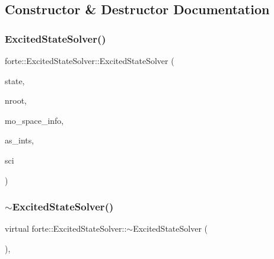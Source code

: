 \subsection{Constructor \& Destructor Documentation}
\mbox{\label{classforte_1_1_excited_state_solver_ad0bd62104f32a74a473498b86f351217}} 
\subsubsection{\texorpdfstring{Excited\+State\+Solver()}{ExcitedStateSolver()}}
{\footnotesize\ttfamily forte\+::\+Excited\+State\+Solver\+::\+Excited\+State\+Solver (\begin{DoxyParamCaption}\item[{\mbox{\hyperlink{classforte_1_1_state_info}{State\+Info}}}]{state,  }\item[{size\+\_\+t}]{nroot,  }\item[{std\+::shared\+\_\+ptr$<$ \mbox{\hyperlink{classforte_1_1_m_o_space_info}{M\+O\+Space\+Info}} $>$}]{mo\+\_\+space\+\_\+info,  }\item[{std\+::shared\+\_\+ptr$<$ \mbox{\hyperlink{classforte_1_1_active_space_integrals}{Active\+Space\+Integrals}} $>$}]{as\+\_\+ints,  }\item[{std\+::unique\+\_\+ptr$<$ \mbox{\hyperlink{classforte_1_1_selected_c_i_method}{Selected\+C\+I\+Method}} $>$}]{sci }\end{DoxyParamCaption})}

\mbox{\label{classforte_1_1_excited_state_solver_a188c2390abb69d46932b0f3dec9ded23}} 
\subsubsection{\texorpdfstring{$\sim$\+Excited\+State\+Solver()}{~ExcitedStateSolver()}}
{\footnotesize\ttfamily virtual forte\+::\+Excited\+State\+Solver\+::$\sim$\+Excited\+State\+Solver (\begin{DoxyParamCaption}{ }\end{DoxyParamCaption})\hspace{0.3cm}{\ttfamily [virtual]}, {\ttfamily [default]}}



